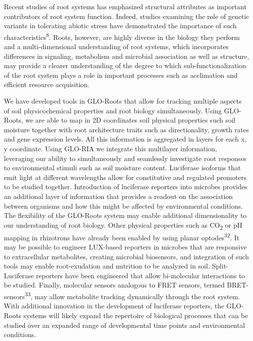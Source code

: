 \documentclass[]{article}
\begin{document}
Recent studies of root systems has emphasized structural attributes as
important contributors of root system function. Indeed, studies
examining the role of genetic variants in tolerating abiotic stress have
demonstrated the importance of such characteristics\textsuperscript{8}.
Roots, however, are highly diverse in the biology they perform and a
multi-dimensional understanding of root systems, which incorporates
differences in signaling, metabolism and microbial association as well
as structure, may provide a clearer understanding of the degree to which
sub-functionalization of the root system plays a role in important
processes such as acclimation and efficient resource acquisition.

We have developed tools in GLO-Roots that allow for tracking multiple
aspects of soil physicochemical properties and root biology
simultaneously. Using GLO-Roots, we are able to map in 2D coordinates
soil physical properties such soil moisture together with root
architecture traits such as directionality, growth rates and gene
expression levels. All this information is aggregated in layers for each
x, y coordinate. Using GLO-RIA we integrate this multilayer information,
leveraging our ability to simultaneously and seamlessly investigate root
responses to environmental stimuli such as soil moisture content.
Luciferase isoforms that emit light at different wavelengths allow for
constitutive and regulated promoters to be studied together.
Introduction of luciferase reporters into microbes provides an
additional layer of information that provides a readout on the
association between organisms and how this might be affected by
environmental conditions. The flexibility of the GLO-Roots system may
enable additional dimensionality to our understanding of root biology.
Other physical properties such as CO\textsubscript{2} or pH mapping in
rhizotrons have already been enabled by using planar
optodes\textsuperscript{32}. It may be possible to engineer LUX-based
reporters in microbes that are responsive to extracellular metabolites,
creating microbial biosensors, and integration of such tools may enable
root-exudation and nutrition to be analyzed in soil. Split-Luciferase
reporters have been engineered that allow bi-molecular interactions to
be studied. Finally, molecular sensors analogous to FRET sensors, termed
BRET-sensors\textsuperscript{33}, may allow metabolite tracking
dynamically through the root system. With additional innovation in the
development of luciferase reporters, the GLO-Roots systems will likely
expand the repertoire of biological processes that can be studied over
an expanded range of developmental time points and environmental
conditions.
\end{document}
